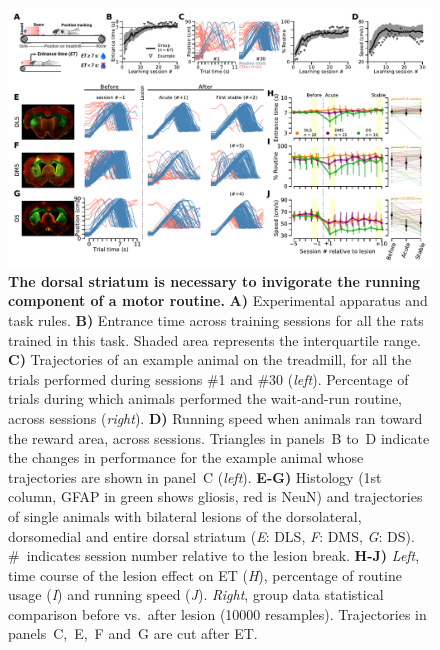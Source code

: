 \begin{figure}[bth!]
	\begin{center}
		\includegraphics[width=\textwidth]{ch-lesion/figures/Task_Example_Group.pdf}
		\caption[The Striatum Energizes Motor Routines]
		{\textbf{The dorsal striatum is necessary to invigorate the running component of a motor routine.}
		\textbf{A)} Experimental apparatus and task rules.
		\textbf{B)} Entrance time across training sessions for all the rats trained in this task.
		Shaded area represents the interquartile range.
		\textbf{C)} Trajectories of an example animal on the treadmill, for all the trials performed during sessions \#1 and \#30 (\textit{left}).
		Percentage of trials during which animals performed the wait-and-run routine, across sessions (\textit{right}).
		\textbf{D)} Running speed when animals ran toward the reward area, across sessions.
		Triangles in panels~B to~D indicate the changes in performance for the example animal whose trajectories are shown in panel~C (\textit{left}).
		\textbf{E-G)} Histology (1st column, GFAP in green shows gliosis, red is NeuN) and trajectories of single animals with bilateral lesions of the dorsolateral, dorsomedial and entire dorsal striatum (\textit{E}: DLS, \textit{F}: DMS, \textit{G}: DS).
		\#~indicates session number relative to the lesion break.
		\textbf{H-J)} \textit{Left}, time course of the lesion effect on ET (\textit{H}), percentage of routine usage (\textit{I}) and running speed (\textit{J}).
		\textit{Right}, group data statistical comparison before vs.\ after lesion (10000 resamples).
		Trajectories in panels~C,~E,~F and~G are cut after ET.
		}
		\label{fig:lesion:task}
	\end{center}
\end{figure}